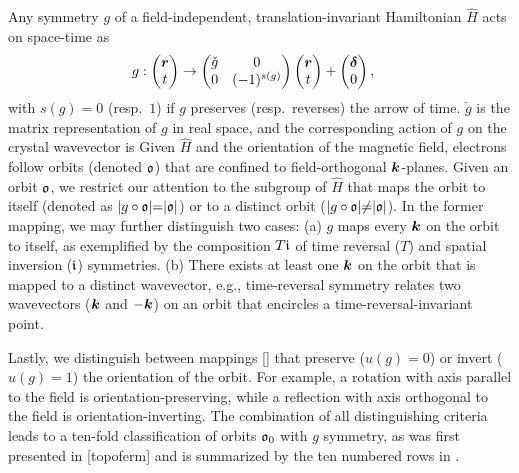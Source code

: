 \documentclass[aps, prb, showpacs, twocolumn, notitlepage, superscriptaddress]{revtex4-1}
\begin{document}


Any symmetry $g$ of a field-independent, translation-invariant Hamiltonian $\hat{H}$ acts on space-time as
\begin{align}
&g: \begin{pmatrix} {\boldsymbol{r}}\\{t} \end{pmatrix} \rightarrow \begin{pmatrix} \check{g} & 0 \\ 0 &  (-1)^{s(g)} \end{pmatrix}\begin{pmatrix} {\boldsymbol{r}}\\{t} \end{pmatrix}+\begin{pmatrix} {\boldsymbol{\delta}}\\{0} \end{pmatrix}, \label{definesg}
\end{align}
with $s(g){=}0$ (resp.\ $1$) if $g$ preserves (resp.\  reverses) the arrow of time. $\check{g}$ is the matrix representation of $g$ in real space, and the corresponding action of  $g$ on the crystal wavevector is  
Given $\hat{H}$ and the orientation of the magnetic field, electrons follow orbits (denoted $\mathfrak{o}$) that are confined to field-orthogonal $\boldsymbol{k}$-planes.  Given an orbit $\mathfrak{o}$, we restrict our attention to the subgroup of $\hat{H}$ that maps the orbit to itself (denoted as $|g\circ\mathfrak{o}|{=}|\mathfrak{o}|$) or to a distinct orbit ($|g\circ\mathfrak{o}|{\ne}|\mathfrak{o}|$). In the former mapping, we may further distinguish two cases: (a)  $g$ maps every $\boldsymbol{k}$ on the orbit to itself, as exemplified by the composition $T\mathfrak{i}$ of time reversal ($T$) and spatial inversion ($\mathfrak{i}$)  symmetries. (b) There exists at least one $\boldsymbol{k}$ on the orbit that is mapped to a distinct wavevector, e.g., time-reversal symmetry relates two wavevectors ($\boldsymbol{k}$ and ${-}\boldsymbol{k}$) on an orbit that encircles a time-reversal-invariant point. 

Lastly, we distinguish  between mappings [] that preserve  ($u(g){=}0$) or invert ($u(g){=}1$) the orientation of the orbit. For example, a rotation with axis parallel to the field is orientation-preserving, while a reflection with axis orthogonal to the field is orientation-inverting. The combination of all distinguishing criteria leads to   a ten-fold classification of orbits $\mathfrak{o}_0$ with $g$ symmetry, as was first presented in [topoferm] and is summarized by the ten numbered rows in .
 
 



 
\end{document}
